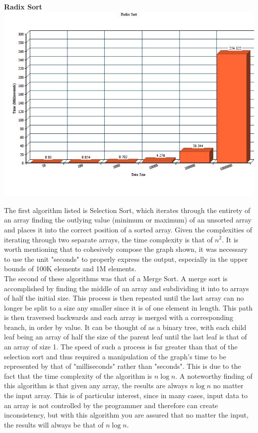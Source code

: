 \documentclass[10pt]{article}
\newcommand\tab[1][.5cm]{\hspace*{#1}}
\begin{document}
\textbf{Radix Sort}
\includegraphics[scale=0.6]{Radix.jpg}

\normalsize
\flushleft



\tab The first algorithm listed is Selection Sort, which iterates through the entirety of an array finding the outlying value (minimum or maximum) of an unsorted array and places it into the correct position of a sorted array.  Given the complexities of iterating through two separate arrays, the time complexity is that of $n^2$.  It is worth mentioning that to cohesively compose the graph shown, it was necessary to use the unit "seconds" to properly express the output, especially in the upper bounds of 100K elements and 1M elements.\\

\tab The second of these algorithms was that of a Merge Sort.  A merge sort is accomplished by finding the middle of an array and subdividing it into to arrays of half the initial size.  This process is then repeated until the last array can no longer be split to a size any smaller since it is of one element in length.  This path is then traversed backwards and each array is merged with a corresponding branch, in order by value.  It can be thought of as a binary tree, with each child leaf being an array of half the size of the parent leaf until the last leaf is that of an array of size 1.  The speed of such a process is far greater than that of the selection sort and thus required a manipulation of the graph's time to be represented by that of "milliseconds" rather than "seconds".  This is due to the fact that the time complexity of the algorithm is $n \log n$.  A noteworthy finding of this algorithm is that given any array, the results are always $n \log n$ no matter the input array.  This is of particular interest, since in many cases, input data to an array is not controlled by the programmer and therefore can create inconsistency, but with this algorithm you are assured that no matter the input, the results will always be that of $n \log n$.\\
\end{document}
